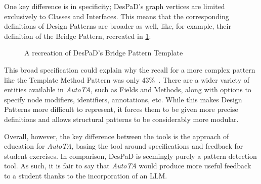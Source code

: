 One key difference is in specificity; DesPaD's graph vertices are limited exclusively to Classes and Interfaces. This means that the corresponding definitions of Design Patterns are broader as well, like, for example, their definition of the Bridge Pattern, recreated in \cref{fig:GRAPHL}:

\begin{figure}[H]
\centering

\caption{A recreation of DesPaD's Bridge Pattern Template~\cite{DESPAD}}
\label{fig:GRAPHL}
\end{figure}

This broad specification could explain why the recall for a more complex pattern like the Template Method Pattern was only 43\%~\cite{DESPAD}. There are a wider variety of entities available in \emph{AutoTA}, such as Fields and Methods, along with options to specify node modifiers, identifiers, annotations, etc. While this makes Design Patterns more difficult to represent, it forces them to be given more precise definitions and allows structural patterns to be considerably more modular.

Overall, however, the key difference between the tools is the approach of education for \emph{AutoTA}, basing the tool around specifications and feedback for student exercises. In comparison, DesPaD is seemingly purely a pattern detection tool. As such, it is fair to say that \emph{AutoTA} would produce more useful feedback to a student thanks to the incorporation of an LLM.